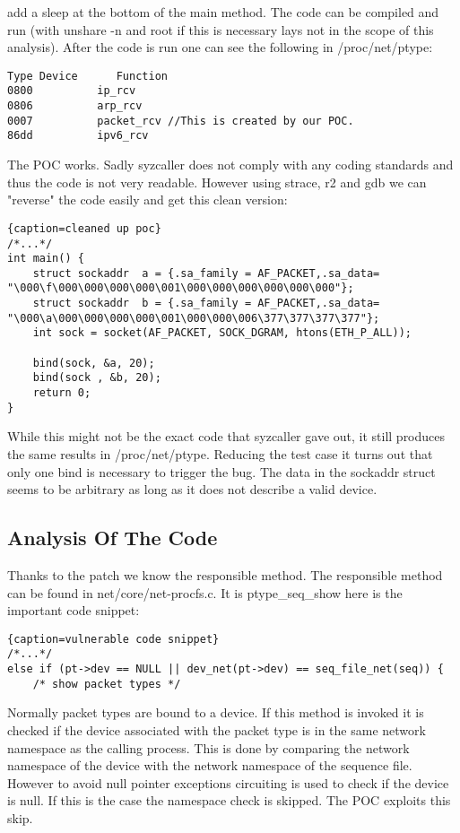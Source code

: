 \documentclass[10pt,twocolumn,a4paper]{article}
\begin{document}
add a sleep at the bottom of the main method. The code can be compiled and run (with unshare -n and root if this
is necessary lays not in the scope of this analysis). After the code is run one can see the following
in /proc/net/ptype:
\begin{lstlisting}
Type Device      Function
0800          ip_rcv
0806          arp_rcv
0007          packet_rcv //This is created by our POC.
86dd          ipv6_rcv
\end{lstlisting}
The POC works. Sadly syzcaller does not comply with any coding standards and thus the code is
not very readable. However using strace, r2\cite{29} and gdb\cite{28} we can "reverse" the code easily and get this
clean version:
\begin{lstlisting}{caption=cleaned up poc}
/*...*/
int main() {
    struct sockaddr  a = {.sa_family = AF_PACKET,.sa_data= "\000\f\000\000\000\000\001\000\000\000\000\000\000"};
    struct sockaddr  b = {.sa_family = AF_PACKET,.sa_data= "\000\a\000\000\000\000\001\000\000\006\377\377\377\377"};
    int sock = socket(AF_PACKET, SOCK_DGRAM, htons(ETH_P_ALL));

    bind(sock, &a, 20);
    bind(sock , &b, 20);
    return 0;
}
\end{lstlisting}
While this might not be the exact code that syzcaller gave out, it still
produces the same results in /proc/net/ptype. Reducing the test case it turns out that only one bind is necessary to trigger the bug. The data in the sockaddr struct seems to be arbitrary
as long as it does not describe a valid device. 
\subsection{Analysis Of The Code}
Thanks to the patch we know the responsible method.
The responsible method can be found in net/core/net-procfs.c. It is ptype\_seq\_show
here is the important code snippet:
\begin{lstlisting}{caption=vulnerable code snippet}
/*...*/
else if (pt->dev == NULL || dev_net(pt->dev) == seq_file_net(seq)) {
    /* show packet types */
\end{lstlisting}
Normally packet types are bound to a device. If this method is invoked it is checked if the device
associated with the packet type is in the same network namespace as the calling process. This is
done by comparing the network namespace of the device with the network namespace of the sequence file.
However to avoid null pointer exceptions circuiting is used to check if the device is null. If
this is the case the namespace check is skipped. The POC exploits this skip.
\end{document}
